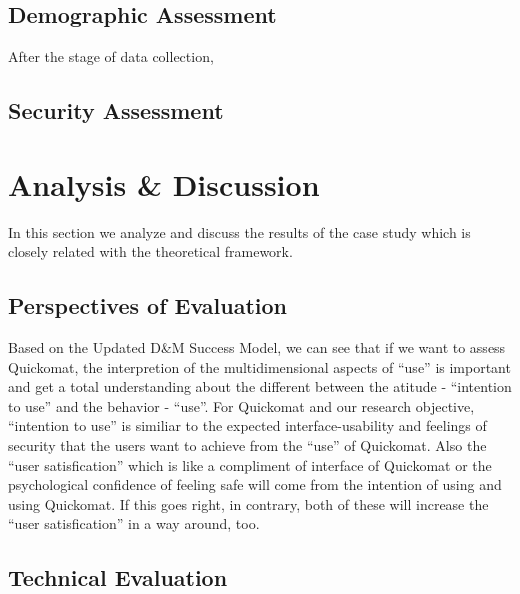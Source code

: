 \documentclass[twocolumn]{article}
\begin{document}
\subsection{Demographic Assessment}
After the stage of data collection, 

\subsection{Security Assessment}

\section{Analysis \& Discussion}
In this section we analyze and discuss the results of the case study which is closely related with the theoretical framework.

\subsection{Perspectives of Evaluation}
Based on the Updated D\&M Success Model, we can see that if we want to assess Quickomat, the interpretion of the multidimensional aspects of “use” is important and get a total understanding about the different between the atitude - “intention to use” and the behavior - “use”. For Quickomat and our research objective, “intention to use” is similiar to the expected interface-usability and feelings of security that the users want to achieve from the “use” of Quickomat. Also the “user satisfication” which is like a compliment of interface of Quickomat or the psychological confidence of feeling safe will come from the intention of using and using Quickomat. If this goes right, in contrary, both of these will increase the “user satisfication” in a way around, too.  

\subsection{Technical Evaluation}
\end{document}
